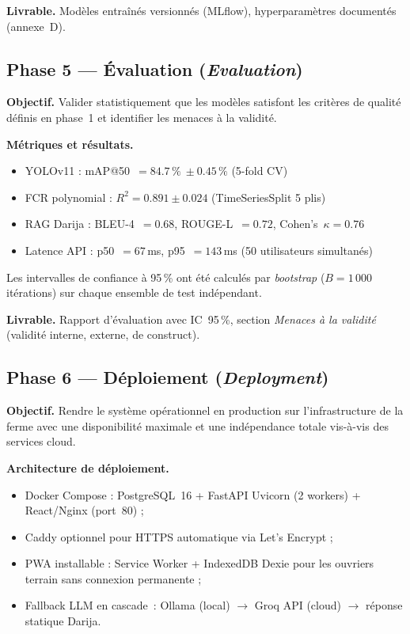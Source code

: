 \textbf{Livrable.} Modèles entraînés versionnés (MLflow),
hyperparamètres documentés (annexe~D).

\subsection*{Phase 5 --- Évaluation (\textit{Evaluation})}

\textbf{Objectif.} Valider statistiquement que les modèles satisfont les
critères de qualité définis en phase~1 et identifier les menaces à la validité.

\textbf{Métriques et résultats.}
\begin{itemize}
  \item YOLOv11 : mAP@50~$= 84.7\,\%\ \pm 0.45\,\%$ (5-fold CV)
  \item FCR polynomial : $R^2 = 0.891 \pm 0.024$ (TimeSeriesSplit 5 plis)
  \item RAG Darija : BLEU-4~$= 0.68$, ROUGE-L~$= 0.72$,
        Cohen's~$\kappa = 0.76$~\cite{cohen1960,landis1977}
  \item Latence API : p50~$= 67$\,ms, p95~$= 143$\,ms
        (50 utilisateurs simultanés)
\end{itemize}

Les intervalles de confiance à 95\,\% ont été calculés par \textit{bootstrap}
($B = 1\,000$ itérations) sur chaque ensemble de test indépendant.

\textbf{Livrable.} Rapport d'évaluation avec IC~95\,\%, section
\textit{Menaces à la validité} (validité interne, externe, de construct).

\subsection*{Phase 6 --- Déploiement (\textit{Deployment})}

\textbf{Objectif.} Rendre le système opérationnel en production sur
l'infrastructure de la ferme avec une disponibilité maximale et une
indépendance totale vis-à-vis des services cloud.

\textbf{Architecture de déploiement.}
\begin{itemize}
  \item Docker Compose : PostgreSQL~16 + FastAPI Uvicorn (2 workers)
        + React/Nginx (port~80) ;
  \item Caddy optionnel pour HTTPS automatique via Let's Encrypt ;
  \item PWA installable : Service Worker + IndexedDB Dexie pour les
        ouvriers terrain sans connexion permanente ;
  \item Fallback LLM en cascade~:
        Ollama (local) $\rightarrow$ Groq API (cloud) $\rightarrow$
        réponse statique Darija.
\end{itemize}

